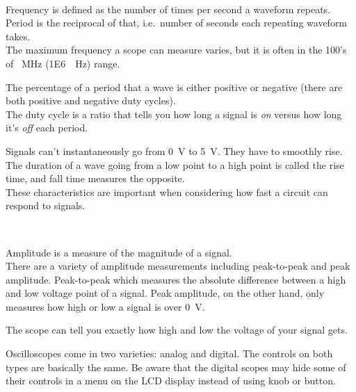\documentclass[12pt, logo=tehranDLDL/ut]{tehranDLDL}
\begin{document}
\begin{description}[font=\labelitemi\ \bfseries]
    \item[Timing characteristics]~
    \begin{description}[font=\labelitemii\ \bfseries]
        \item[Frequency \& period]
        Frequency is defined as the number of times per second a waveform repeats.
        Period is the reciprocal of that, i.e.\ number of seconds each repeating waveform takes.\\
        The maximum frequency a scope can measure varies, but it is often in the 100's of \SI{}{\mega\hertz} (1E6~\SI{}{\hertz}) range.
        \item[Duty cycle]
        The percentage of a period that a wave is either positive or negative (there are both positive and negative duty cycles).\\
        The duty cycle is a ratio that tells you how long a signal is \textit{on} versus how long it's \textit{off} each period.
        \item[Rise \& fall time]
        Signals can't instantaneously go from \SI{0}{\volt} to \SI{5}{\volt}. They have to smoothly rise. The duration of a wave going from a low point to a high point is called the rise time, and fall time measures the opposite.\\
        These characteristics are important when considering how fast a circuit can respond to signals.
    \end{description}
    \item[Voltage characteristics]~
    \begin{description}[font=\labelitemii\ \bfseries]
        \item[Amplitude]
        Amplitude is a measure of the magnitude of a signal.\\
        There are a variety of amplitude measurements including peak-to-peak and peak amplitude.
        Peak-to-peak which measures the absolute difference between a high and low voltage point of a signal.
        Peak amplitude, on the other hand, only measures how high or low a signal is over \SI{0}{\volt}.
        \item[Maximum \& minimum voltages]
        The scope can tell you exactly how high and low the voltage of your signal gets.
    \end{description}
\end{description}

Oscilloscopes come in two varieties: analog and digital. The controls on both types are basically the same.
Be aware that the digital scopes may hide some of their controls in a menu on the LCD display instead of using knob or button.
\end{document}

